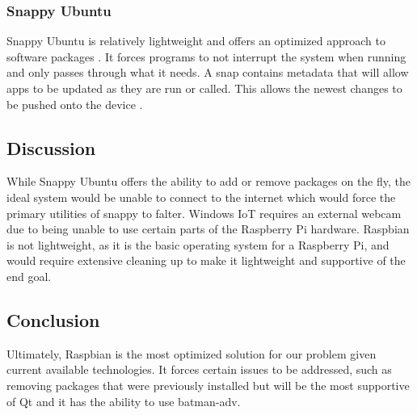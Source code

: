 \documentclass[onecolumn, draftclsnofoot,10pt, compsoc]{IEEEtran}
\begin{document}
\subsubsection{Snappy Ubuntu}

Snappy Ubuntu is relatively lightweight and offers an optimized approach to software packages \cite{snappy:what}. It forces programs to not interrupt the system when running and only passes through what it needs. A snap contains metadata that will allow apps to be updated as they are run or called. This allows the newest changes to be pushed onto the device \cite{snappy:main}. 

\subsection{Discussion}

While Snappy Ubuntu offers the ability to add or remove packages on the fly, the ideal system would be unable to connect to the internet which would force the primary utilities of snappy to falter. Windows IoT requires an external webcam due to being unable to use certain parts of the Raspberry Pi hardware. Raspbian is not lightweight, as it is the basic operating system for a Raspberry Pi, and would require extensive cleaning up to make it lightweight and supportive of the end goal.

\subsection{Conclusion}

Ultimately, Raspbian is the most optimized solution for our problem given current available technologies. It forces certain issues to be addressed, such as removing packages that were previously installed but will be the most supportive of Qt and it has the ability to use batman-adv.

\newpage


\end{document}
